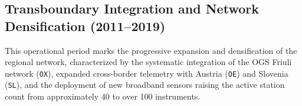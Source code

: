 
\subsection*{Transboundary Integration and Network Densification (2011--2019)}
This operational period marks the progressive expansion and densification of
the regional network, characterized by the systematic integration of the
\ac{OGS} Friuli network (\texttt{OX}), expanded cross-border telemetry with
Austria (\texttt{OE}) and Slovenia (\texttt{SL}), and the deployment of new
broadband sensors raising the active station count from approximately 40 to
over 100 instruments.

